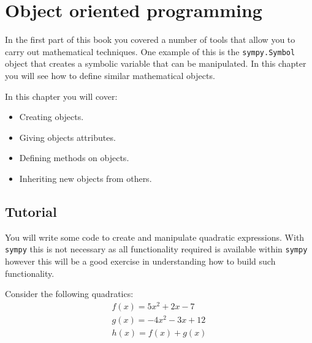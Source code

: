 \chapter{Object oriented programming}
\label{chp:objects}

In the first part of this book you covered a number of tools that allow you to
carry out mathematical techniques. One example of this is the \texttt{sympy.Symbol}
object that creates a symbolic variable that can be manipulated. In this chapter
you will see how to define similar mathematical objects.


\begin{note}
In this chapter you will cover:
\begin{itemize}
\item 

Creating objects.

\item 

Giving objects attributes.

\item 

Defining methods on objects.

\item 

Inheriting new objects from others.

\end{itemize}
\end{note}





\section{Tutorial}
\label{sec:objects_tutorial}

You will write some code to create and manipulate quadratic expressions.
With \texttt{sympy} this is not necessary as all functionality required is available
within \texttt{sympy} however this will be a good exercise in understanding how to
build such functionality.


Consider the following quadratics:
\begin{equation*}
\begin{split}
f(x) = 5 x ^ 2 + 2 x - 7\\
g(x) = - 4 x ^ 2 - 3 x + 12\\
h(x) = f(x) + g(x)
\end{split}
\end{equation*}

